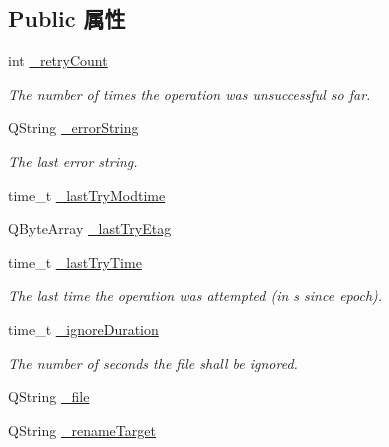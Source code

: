 \subsection*{Public 属性}
\begin{DoxyCompactItemize}
\item 
int \hyperlink{class_o_c_c_1_1_sync_journal_error_blacklist_record_aa5562e448450d2786cea20a8c08eb278}{\+\_\+retry\+Count}
\begin{DoxyCompactList}\small\item\em The number of times the operation was unsuccessful so far. \end{DoxyCompactList}\item 
Q\+String \hyperlink{class_o_c_c_1_1_sync_journal_error_blacklist_record_a44c0da4b7ca183e1ca7f6ab4d384e9be}{\+\_\+error\+String}
\begin{DoxyCompactList}\small\item\em The last error string. \end{DoxyCompactList}\item 
time\+\_\+t \hyperlink{class_o_c_c_1_1_sync_journal_error_blacklist_record_a4bebdc7111936f93be4ef58b7d3da66a}{\+\_\+last\+Try\+Modtime}
\item 
Q\+Byte\+Array \hyperlink{class_o_c_c_1_1_sync_journal_error_blacklist_record_a3242ba11f49704de7f76318fb611e23f}{\+\_\+last\+Try\+Etag}
\item 
time\+\_\+t \hyperlink{class_o_c_c_1_1_sync_journal_error_blacklist_record_a8aeb180da84a68f09fd6d99aa577684d}{\+\_\+last\+Try\+Time}
\begin{DoxyCompactList}\small\item\em The last time the operation was attempted (in s since epoch). \end{DoxyCompactList}\item 
time\+\_\+t \hyperlink{class_o_c_c_1_1_sync_journal_error_blacklist_record_a243493fcdc41b616b6c7ec1b88cfcfd3}{\+\_\+ignore\+Duration}
\begin{DoxyCompactList}\small\item\em The number of seconds the file shall be ignored. \end{DoxyCompactList}\item 
Q\+String \hyperlink{class_o_c_c_1_1_sync_journal_error_blacklist_record_a9a9b2ab7e57c5bc204461f81e5c251bd}{\+\_\+file}
\item 
Q\+String \hyperlink{class_o_c_c_1_1_sync_journal_error_blacklist_record_afc0b7c9395fe91b5ac8d97ffacc44d3e}{\+\_\+rename\+Target}
\end{DoxyCompactItemize}


